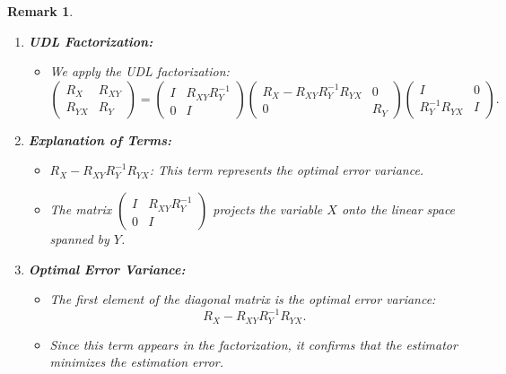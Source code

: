 \documentclass[a4 paper]{article}
\numberwithin{equation}{section}
\theoremstyle{boldStyle}
\newtheorem{remark}{Remark}[section]
\theoremstyle{boldBlueStyle}
\theoremstyle{boldPurpleStyle}
\theoremstyle{boldRedStyle}
\theoremstyle{boldGreenStyle}
\begin{document}
\begin{remark}
\begin{enumerate}
      \item \textbf{UDL Factorization:}
      \begin{itemize}
          \item We apply the UDL factorization:
          \[
          \begin{pmatrix}
          R_X & R_{XY} \\
          R_{YX} & R_Y
          \end{pmatrix} =
          \begin{pmatrix}
          I & R_{XY} R_Y^{-1} \\
          0 & I
          \end{pmatrix}
          \begin{pmatrix}
          R_X - R_{XY} R_Y^{-1} R_{YX} & 0 \\
          0 & R_Y
          \end{pmatrix}
          \begin{pmatrix}
          I & 0 \\
          R_Y^{-1} R_{YX} & I
          \end{pmatrix}.
          \]
      \end{itemize}
      
      \item \textbf{Explanation of Terms:}
      \begin{itemize}
          \item \( R_X - R_{XY} R_Y^{-1} R_{YX} \): This term represents the optimal error variance.
          \item The matrix \( \begin{pmatrix} I & R_{XY} R_Y^{-1} \\ 0 & I \end{pmatrix} \) projects the variable \( X \) onto the linear space spanned by \( Y \).
      \end{itemize}
      
      \item \textbf{Optimal Error Variance:}
      \begin{itemize}
          \item The first element of the diagonal matrix is the optimal error variance:
          \[
          R_X - R_{XY} R_Y^{-1} R_{YX}.
          \]
          \item Since this term appears in the factorization, it confirms that the estimator minimizes the estimation error.
      \end{itemize}
      

\end{enumerate}
\end{remark}
\end{document}
